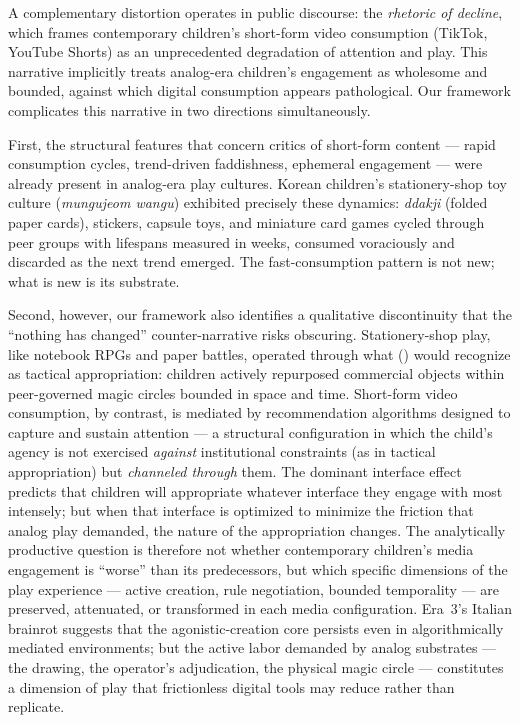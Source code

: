 \documentclass[12pt]{article}
\begin{document}
A complementary distortion operates in public discourse: the \emph{rhetoric of decline}, which frames contemporary children's short-form video consumption (TikTok, YouTube Shorts) as an unprecedented degradation of attention and play. This narrative implicitly treats analog-era children's engagement as wholesome and bounded, against which digital consumption appears pathological. Our framework complicates this narrative in two directions simultaneously.

First, the structural features that concern critics of short-form content --- rapid consumption cycles, trend-driven faddishness, ephemeral engagement --- were already present in analog-era play cultures. Korean children's stationery-shop toy culture (\emph{mungujeom wangu}) exhibited precisely these dynamics: \emph{ddakji} (folded paper cards), stickers, capsule toys, and miniature card games cycled through peer groups with lifespans measured in weeks, consumed voraciously and discarded as the next trend emerged. The fast-consumption pattern is not new; what is new is its substrate.

Second, however, our framework also identifies a qualitative discontinuity that the ``nothing has changed'' counter-narrative risks obscuring. Stationery-shop play, like notebook RPGs and paper battles, operated through what \citeauthor{decerteau1984} (\citeyear{decerteau1984}) would recognize as tactical appropriation: children actively repurposed commercial objects within peer-governed magic circles bounded in space and time. Short-form video consumption, by contrast, is mediated by recommendation algorithms designed to capture and sustain attention --- a structural configuration in which the child's agency is not exercised \emph{against} institutional constraints (as in tactical appropriation) but \emph{channeled through} them. The dominant interface effect predicts that children will appropriate whatever interface they engage with most intensely; but when that interface is optimized to minimize the friction that analog play demanded, the nature of the appropriation changes. The analytically productive question is therefore not whether contemporary children's media engagement is ``worse'' than its predecessors, but which specific dimensions of the play experience --- active creation, rule negotiation, bounded temporality --- are preserved, attenuated, or transformed in each media configuration. Era~3's Italian brainrot suggests that the agonistic-creation core persists even in algorithmically mediated environments; but the active labor demanded by analog substrates --- the drawing, the operator's adjudication, the physical magic circle --- constitutes a dimension of play that frictionless digital tools may reduce rather than replicate.
\end{document}
